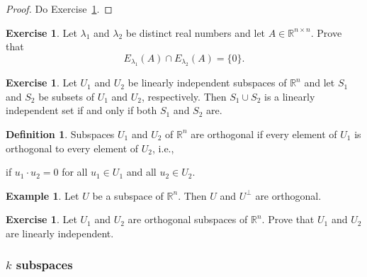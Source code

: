 \documentclass{amsart}
\newcommand{\RR}{\mathbb{R}}
\theoremstyle{definition}
\newtheorem{definition}[theorem]{Definition}
\newtheorem{example}[theorem]{Example}
\newtheorem{exercise}[theorem]{Exercise}
\begin{document}
 \begin{proof}
  Do Exercise~\ref{exercise:distinct_eigenspaces_independent}.
 \end{proof}

 \begin{exercise}\label{exercise:distinct_eigenspaces_independent}
Let $\lambda_1$ and $\lambda_2$ be distinct real numbers and let $A\in\RR^{n\times n}$.
Prove that $$E_{\lambda_1}(A)\cap E_{\lambda_2}(A) = \{0\}.$$
 \end{exercise}

\begin{exercise}
  Let $U_1$ and $U_2$ be linearly independent subspaces of $\RR^n$ and let $S_1$ and $S_2$ be subsets of $U_1$ and $U_2$, respectively.
  Then $S_1\cup S_2$ is a linearly independent set if and only if both $S_1$ and $S_2$ are.
\end{exercise}

\begin{definition}
  Subspaces $U_1$ and $U_2$ of $\RR^n$ are orthogonal if every element of $U_1$ is orthogonal to every element of $U_2$, i.e.,
  \begin{center}
    if $u_1\cdot u_2=0$ for all $u_1\in U_1$ and all $u_2\in U_2$.
  \end{center}
\end{definition}

\begin{example}
  Let $U$ be a subspace of $\RR^n$. Then $U$ and $U^\perp$ are orthogonal.
\end{example}

\begin{exercise}
  Let $U_1$ and $U_2$ are orthogonal subspaces of $\RR^n$.
  Prove that $U_1$ and $U_2$ are linearly independent.
\end{exercise}


\subsubsection{$k$ subspaces}
\end{document}
